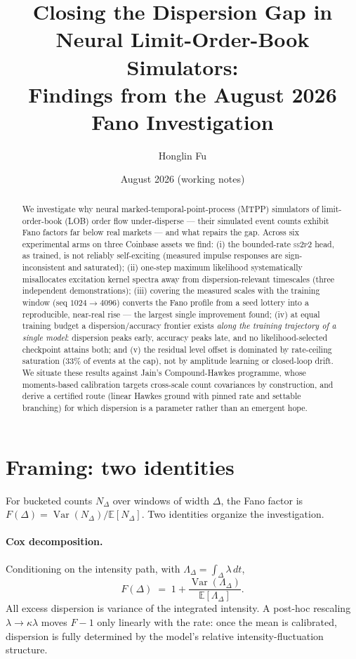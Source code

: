 \documentclass[11pt]{article}
\title{Closing the Dispersion Gap in Neural Limit-Order-Book Simulators:\\
Findings from the August 2026 Fano Investigation}
\author{Honglin Fu}
\date{August 2026 (working notes)}
\newcommand{\ssppp}{\textsc{ss2p2}}
\newcommand{\Fano}{F}
\begin{document}
\maketitle

\begin{abstract}
We investigate why neural marked-temporal-point-process (MTPP) simulators of
limit-order-book (LOB) order flow under-disperse --- their simulated event
counts exhibit Fano factors far below real markets --- and what repairs the
gap. Across six experimental arms on three Coinbase assets we find:
(i) the bounded-rate \ssppp{} head, as trained, is not reliably self-exciting
(measured impulse responses are sign-inconsistent and saturated);
(ii) one-step maximum likelihood systematically misallocates excitation
kernel spectra away from dispersion-relevant timescales (three independent
demonstrations); (iii) covering the measured scales with the training window
(seq $1024\!\to\!4096$) converts the Fano profile from a seed lottery into a
reproducible, near-real rise --- the largest single improvement found;
(iv) at equal training budget a dispersion/accuracy frontier exists
\emph{along the training trajectory of a single model}: dispersion peaks
early, accuracy peaks late, and no likelihood-selected checkpoint attains
both; and (v) the residual level offset is dominated by rate-ceiling
saturation ($33\%$ of events at the cap), not by amplitude learning or
closed-loop drift. We situate these results against Jain's Compound-Hawkes
programme, whose moments-based calibration targets cross-scale count
covariances by construction, and derive a certified route (linear Hawkes
ground with pinned rate and settable branching) for which dispersion is a
parameter rather than an emergent hope.
\end{abstract}

\section{Framing: two identities}
For bucketed counts $N_\Delta$ over windows of width $\Delta$, the Fano
factor is $\Fano(\Delta)=\operatorname{Var}(N_\Delta)/\mathbb{E}[N_\Delta]$.
Two identities organize the investigation.

\paragraph{Cox decomposition.} Conditioning on the intensity path, with
$\Lambda_\Delta=\int_\Delta\lambda\,dt$,
\begin{equation}
\Fano(\Delta) \;=\; 1+\frac{\operatorname{Var}(\Lambda_\Delta)}{\mathbb{E}[\Lambda_\Delta]}.
\label{eq:cox}
\end{equation}
All excess dispersion is variance of the integrated intensity. A post-hoc
rescaling $\lambda\!\to\!\kappa\lambda$ moves $\Fano-1$ only linearly with the
rate: once the mean is calibrated, dispersion is fully determined by the
model's relative intensity-fluctuation structure.
\end{document}
